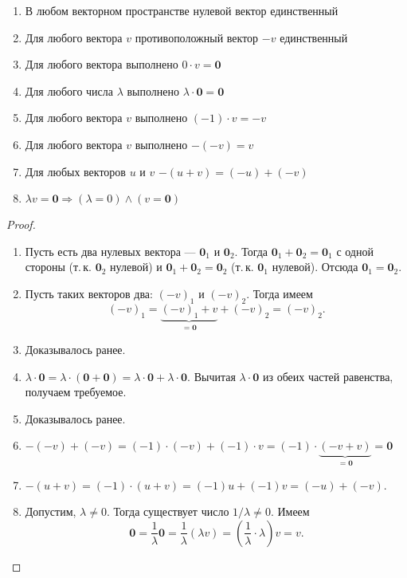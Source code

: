 \begin{theorem}
    \begin{enumerate}
            \item В любом векторном пространстве нулевой вектор единственный
            \item Для любого вектора $v$ противоположный вектор $-v$ единственный
            \item Для любого вектора выполнено $0\cdot v = \boldsymbol{0}$
            \item Для любого числа $\lambda$ выполнено $\lambda \cdot \boldsymbol{0} = \boldsymbol{0}$
            \item Для любого вектора $v$ выполнено $(-1) \cdot v = -v$
            \item Для любого вектора $v$ выполнено $-(-v) = v$
            \item Для любых векторов $u$ и $v$ $-(u + v) = (-u) + (-v)$
            \item $\lambda v = \boldsymbol{0} \Rightarrow (\lambda = 0) \wedge (v = \boldsymbol{0})$
    \end{enumerate}
\end{theorem}

\begin{proof}
    \begin{enumerate}
        \item Пусть есть два нулевых вектора --- $\boldsymbol{0}_1$ и $\boldsymbol{0}_2$. Тогда $\boldsymbol{0}_1 + \boldsymbol{0}_2 = \boldsymbol{0}_1$ с одной стороны (т.\,к. $\boldsymbol{0}_2$ нулевой) и $\boldsymbol{0}_1 + \boldsymbol{0}_2 = \boldsymbol{0}_2$ (т.\,к. $\boldsymbol{0}_1$ нулевой). Отсюда $\boldsymbol{0}_1 = \boldsymbol{0}_2$.
        \item Пусть таких векторов два: $(-v)_1$ и $(-v)_2$. Тогда имеем
            $$
            (-v)_1 = \underbrace{(-v)_1 + v}_{{} = \boldsymbol{0}} + (-v)_2 = (-v)_2.
            $$
        \item Доказывалось ранее.
        \item $\lambda\cdot\boldsymbol{0} = \lambda\cdot(\boldsymbol{0} + \boldsymbol{0}) = \lambda\cdot\boldsymbol{0} + \lambda\cdot\boldsymbol{0}$. Вычитая $\lambda\cdot\boldsymbol{0}$ из обеих частей равенства, получаем требуемое.
        \item Доказывалось ранее.
        \item $-(-v) + (-v) = (-1) \cdot (-v) + (-1) \cdot v = (-1) \cdot \underbrace{(-v + v)}_{{} = \boldsymbol{0}} = \boldsymbol{0}$
        \item $-(u + v) = (-1) \cdot (u + v) = (-1)u + (-1)v = (-u) + (-v)$.
        \item Допустим, $\lambda \ne 0$. Тогда существует число $1 / \lambda \ne 0$. Имеем
            $$
            \boldsymbol{0} = \frac{1}{\lambda}\boldsymbol{0} = \frac{1}{\lambda}(\lambda v) = \left(\frac{1}{\lambda} \cdot \lambda\right) v = v.
            $$
    \end{enumerate}
\end{proof}

